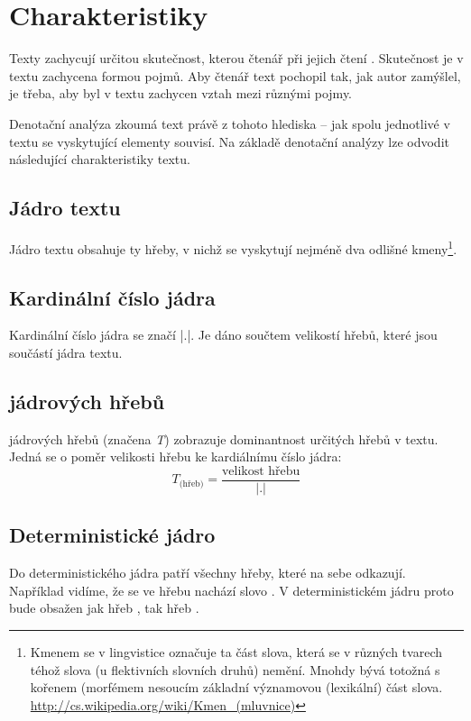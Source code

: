 \documentclass[dp.tex]{subfiles}
\begin{document}
\section{Charakteristiky}

Texty zachycují určitou skutečnost, kterou čtenář při jejich čtení . Skutečnost je v textu zachycena formou pojmů. Aby čtenář text pochopil tak, jak autor zamýšlel, je třeba, aby byl v textu zachycen vztah mezi různými pojmy.

Denotační analýza zkoumá text právě z tohoto hlediska -- jak spolu jednotlivé v textu se vyskytující elementy souvisí. Na základě denotační analýzy lze odvodit následující charakteristiky textu.

\subsection{Jádro textu}
Jádro textu obsahuje ty hřeby, v nichž se vyskytují nejméně dva odlišné kmeny\footnote{Kmenem se v lingvistice označuje ta část slova, která se v různých tvarech téhož slova (u flektivních slovních druhů) nemění. Mnohdy bývá totožná s kořenem (morfémem nesoucím základní významovou (lexikální) část slova. \url{http://cs.wikipedia.org/wiki/Kmen_(mluvnice)} }.

\subsection{Kardinální číslo jádra}
Kardinální číslo jádra se značí |.|. Je dáno součtem velikostí hřebů, které jsou součástí jádra textu.

\subsection{ jádrových hřebů}
 jádrových hřebů (značena \textit{T}) zobrazuje dominantnost určitých hřebů v textu.  Jedná se o poměr velikosti hřebu ke kardiálnímu číslo jádra:
\begin{equation}
T_\text{(hřeb)}=\frac{\text{velikost hřebu}}{|.|}
\end{equation}

\subsection{Deterministické jádro}
Do deterministického jádra patří všechny hřeby, které na sebe odkazují. Například vidíme, že se ve hřebu  nachází slovo . V deterministickém jádru proto bude obsažen jak hřeb , tak hřeb .
\end{document}
